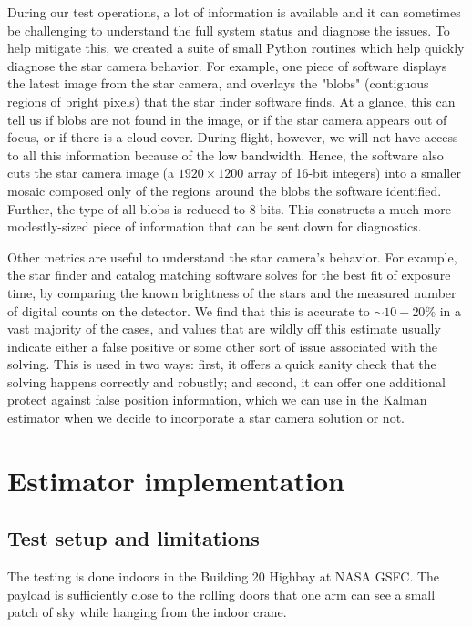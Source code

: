 During our test operations, a lot of information is available and  it can sometimes be challenging to understand the full system status and diagnose the issues. To help mitigate this, we created a suite of small Python routines which help quickly diagnose the star camera behavior. For example, one piece of software displays the latest image from the star camera, and overlays the "blobs" (contiguous regions of bright pixels) that the star finder software finds. At a glance, this can tell us if blobs are not found in the image, or if the star camera appears out of focus, or if there is a cloud cover. During flight, however, we will not have access to all this information because of the low bandwidth. Hence, the software also cuts the star camera image (a $1920\times 1200$ array of 16-bit integers) into a smaller mosaic composed only of the regions around the blobs the software identified. Further, the type of all blobs is reduced to 8 bits. This constructs a much more modestly-sized piece of information that can be sent down for diagnostics.

Other metrics are useful to understand the star camera's behavior. For example, the star finder and catalog matching software solves for the best fit of exposure time, by comparing the known brightness of the stars and the measured number of digital counts on the detector. We find that this is accurate to $\sim 10-20\%$ in a vast majority of the cases, and values that are wildly off this estimate usually indicate either a false positive or some other sort of issue associated with the solving. This is used in two ways: first, it offers a quick sanity check that the solving happens correctly and robustly; and second, it can offer one additional protect against false position information, which we can use in the Kalman estimator when we decide to incorporate a star camera solution or not.


\section{Estimator implementation}

\subsection{Test setup and limitations}

The testing is done indoors in the Building 20 Highbay at NASA GSFC. The payload is sufficiently close to the rolling doors that one arm can see a small patch of sky while hanging from the indoor crane.

